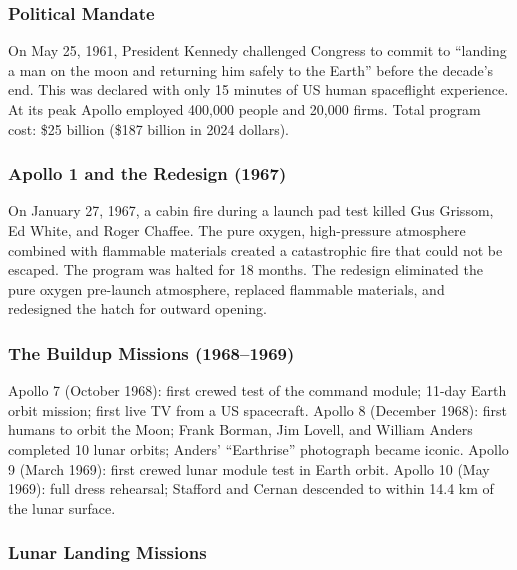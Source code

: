 \documentclass[11pt,letterpaper]{article}
\begin{document}
\subsubsection{Political Mandate}

On May 25, 1961, President Kennedy challenged Congress to commit to ``landing a man on the moon and returning him safely to the Earth'' before the decade's end. This was declared with only 15 minutes of US human spaceflight experience. At its peak Apollo employed 400,000 people and 20,000 firms. Total program cost: \$25 billion (\$187 billion in 2024 dollars).

\subsubsection{Apollo 1 and the Redesign (1967)}

On January 27, 1967, a cabin fire during a launch pad test killed Gus Grissom, Ed White, and Roger Chaffee. The pure oxygen, high-pressure atmosphere combined with flammable materials created a catastrophic fire that could not be escaped. The program was halted for 18 months. The redesign eliminated the pure oxygen pre-launch atmosphere, replaced flammable materials, and redesigned the hatch for outward opening.

\subsubsection{The Buildup Missions (1968--1969)}

Apollo 7 (October 1968): first crewed test of the command module; 11-day Earth orbit mission; first live TV from a US spacecraft. Apollo 8 (December 1968): first humans to orbit the Moon; Frank Borman, Jim Lovell, and William Anders completed 10 lunar orbits; Anders' ``Earthrise'' photograph became iconic. Apollo 9 (March 1969): first crewed lunar module test in Earth orbit. Apollo 10 (May 1969): full dress rehearsal; Stafford and Cernan descended to within 14.4 km of the lunar surface.

\subsubsection{Lunar Landing Missions}
\end{document}
